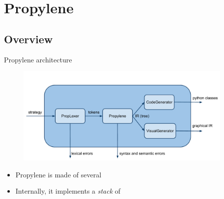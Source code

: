 \section{Propylene}
\subsection{Overview}
\begin{frame}{Propylene architecture}
  \begin{figure}[!h]
    \begin{center}
      \includegraphics[width=300pt]{img/propylene.pdf}
    \end{center}
  \end{figure}
  \begin{itemize}
  \item Propylene is made of several 
  \item Internally, it implements a \emph{stack} of 
  \end{itemize}
\end{frame}
